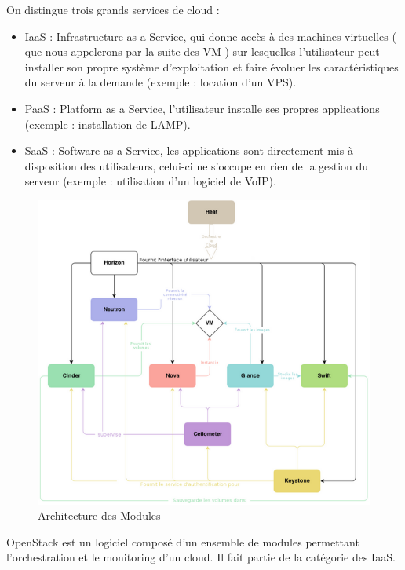 \documentclass{report}
\begin{document}
    On distingue trois grands services de cloud :
    \begin{itemize}
        \item IaaS : Infrastructure as a Service, qui donne accès à des machines virtuelles ( que nous appelerons par la suite des VM ) sur lesquelles l'utilisateur peut installer son propre système d'exploitation et faire évoluer les caractéristiques du serveur à la demande (exemple : location d'un VPS).
        \item PaaS : Platform as a Service, l'utilisateur installe ses propres applications (exemple : installation de LAMP).
        \item SaaS : Software as a Service, les applications sont directement mis à disposition des utilisateurs, celui-ci ne s'occupe en rien de la gestion du serveur (exemple : utilisation d'un logiciel de VoIP).
    \end{itemize}
    \bigbreak
     \begin{figure}[ht]
        \includegraphics[width=\textwidth]{modules}
        \caption{Architecture des Modules}
    \end{figure}
    
    
     
    OpenStack est un logiciel composé d'un ensemble de modules permettant l'orchestration et le monitoring d'un cloud. Il fait partie de la catégorie des IaaS.\bigbreak
    
\end{document}
